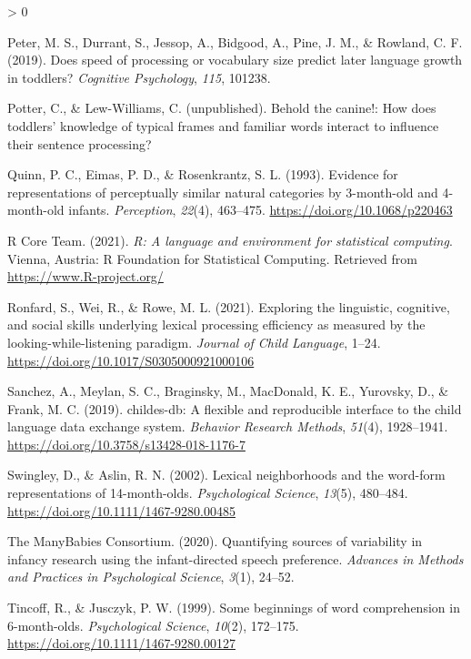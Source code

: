 \documentclass[
  english,
  man,floatsintext]{apa6}
\newlength{\cslhangindent}
\newenvironment{CSLReferences}[2] %
 {%
  \setlength{\parindent}{0pt}
  \ifodd #1 \everypar{\setlength{\hangindent}{\cslhangindent}}\ignorespaces\fi
  \ifnum #2 > 0
  \setlength{\parskip}{#2\baselineskip}
  \fi
 }%
 {}
\begin{document}
\begin{CSLReferences}{1}{0}
\leavevmode\hypertarget{ref-peter2019}{}%
Peter, M. S., Durrant, S., Jessop, A., Bidgood, A., Pine, J. M., \& Rowland, C. F. (2019). Does speed of processing or vocabulary size predict later language growth in toddlers? \emph{Cognitive Psychology}, \emph{115}, 101238.

\leavevmode\hypertarget{ref-PotterLewWilliamsUnpub}{}%
Potter, C., \& Lew-Williams, C. (unpublished). {Behold the canine!: How does toddlers' knowledge of typical frames and familiar words interact to influence their sentence processing?}

\leavevmode\hypertarget{ref-Quinn1993}{}%
Quinn, P. C., Eimas, P. D., \& Rosenkrantz, S. L. (1993). {Evidence for representations of perceptually similar natural categories by 3-month-old and 4-month-old infants}. \emph{Perception}, \emph{22}(4), 463--475. \url{https://doi.org/10.1068/p220463}

\leavevmode\hypertarget{ref-R-base}{}%
R Core Team. (2021). \emph{R: A language and environment for statistical computing}. Vienna, Austria: R Foundation for Statistical Computing. Retrieved from \url{https://www.R-project.org/}

\leavevmode\hypertarget{ref-Ronfard2021}{}%
Ronfard, S., Wei, R., \& Rowe, M. L. (2021). Exploring the linguistic, cognitive, and social skills underlying lexical processing efficiency as measured by the looking-while-listening paradigm. \emph{Journal of Child Language}, 1--24. \url{https://doi.org/10.1017/S0305000921000106}

\leavevmode\hypertarget{ref-Sanchez2019}{}%
Sanchez, A., Meylan, S. C., Braginsky, M., MacDonald, K. E., Yurovsky, D., \& Frank, M. C. (2019). {childes-db: A flexible and reproducible interface to the child language data exchange system}. \emph{Behavior Research Methods}, \emph{51}(4), 1928--1941. \url{https://doi.org/10.3758/s13428-018-1176-7}

\leavevmode\hypertarget{ref-Swingley2002}{}%
Swingley, D., \& Aslin, R. N. (2002). {Lexical neighborhoods and the word-form representations of 14-month-olds}. \emph{Psychological Science}, \emph{13}(5), 480--484. \url{https://doi.org/10.1111/1467-9280.00485}

\leavevmode\hypertarget{ref-manybabies2020}{}%
The ManyBabies Consortium. (2020). {Quantifying sources of variability in infancy research using the infant-directed speech preference}. \emph{Advances in Methods and Practices in Psychological Science}, \emph{3}(1), 24--52.

\leavevmode\hypertarget{ref-Tincoff1999}{}%
Tincoff, R., \& Jusczyk, P. W. (1999). {Some beginnings of word comprehension in 6-month-olds}. \emph{Psychological Science}, \emph{10}(2), 172--175. \url{https://doi.org/10.1111/1467-9280.00127}


\end{CSLReferences}
\end{document}
